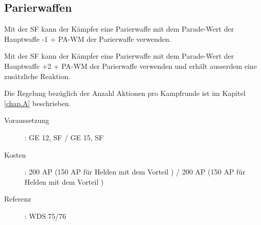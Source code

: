 \subsection{Parierwaffen}
\label{sf.parierwaffen}
Mit der SF  kann der Kämpfer eine Parierwaffe mit dem Parade-Wert der Hauptwaffe -1 + PA-WM der Parierwaffe verwenden.

Mit der SF  kann der Kämpfer eine Parierwaffe mit dem Parade-Wert der Hauptwaffe +2 + PA-WM der Parierwaffe verwenden und erhält ausserdem eine zusätzliche Reaktion.

Die Regelung bezüglich der Anzahl Aktionen pro Kampfrunde ist im Kapitel \ref{chap.A} beschrieben.
\begin{description}
    \item[Voraussetzung]:
        GE 12, SF  / GE 15, SF 
    \item [Kosten]:
        200 AP (150 AP für Helden mit dem Vorteil ) / 200 AP (150 AP für Helden mit dem Vorteil )
    \item [Referenz]:
        WDS 75/76
\end{description}
